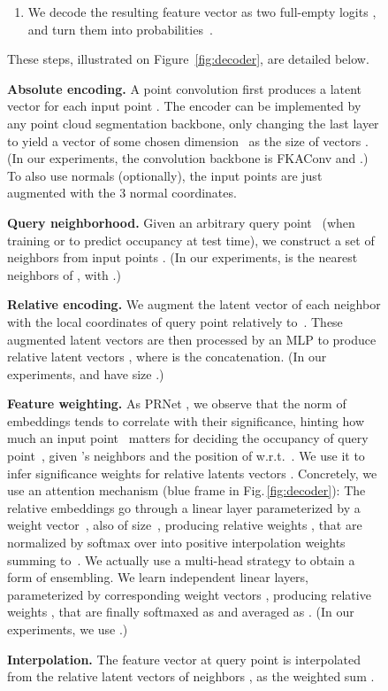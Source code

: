 \documentclass[10pt,twocolumn,letterpaper]{article}
\begin{document}
\begin{figure}[t]
\begin{enumerate}[itemsep=-2pt,topsep=-1pt]
    \item We decode the resulting feature vector  as two full-empty logits , and turn them into probabilities~.
    \label{decodelast}
    
\end{enumerate}\vspace{3pt}
These steps, illustrated on Figure~\ref{fig:decoder}, are detailed below.

\textbf{Absolute encoding.} 
A point convolution first produces a latent vector  for each input point . The encoder  can be implemented by any point cloud segmentation backbone, only changing the last layer to yield a vector of some chosen dimension~ as the size of vectors . (In our experiments, the convolution backbone is FKAConv \cite{Boulch2020ACCV} and .) To also use normals (optionally), the input points are just augmented with the 3 normal coordinates.

\textbf{Query neighborhood.} 
Given an arbitrary query point~ (when training or to predict occupancy at test time), we construct a set of neighbors  from input points . (In our experiments,  is the  nearest neighbors of , with .)

\textbf{Relative encoding.} 
We augment the latent vector  of
each neighbor  with the local coordinates  of query point  relatively to~. These augmented latent vectors are then processed by an MLP  to produce relative latent vectors , where  is the concatenation. (In our experiments,  and  have size .)


\textbf{Feature weighting.}
As PRNet \cite{Wang2019NeurIPS}, we observe that the norm of embeddings  tends to correlate with their significance, hinting how much an input point~ matters for deciding the occupancy of query point~, given 's neighbors and the position of  w.r.t.~.
We use it to infer significance weights for relative latents vectors . Concretely, we use an attention mechanism (blue frame in Fig.\,\ref{fig:decoder}): The relative embeddings  go through a linear layer parameterized by a weight vector~, also of size~, producing relative weights , that are normalized by softmax over  into positive interpolation weights  summing to~.
We actually use a multi-head strategy to obtain a form of ensembling. We learn  independent linear layers, parameterized by  corresponding weight vectors , producing  relative weights , that are finally softmaxed as  and averaged as . (In our experiments, we use .)

\textbf{Interpolation.} The feature vector 
 at query point  is interpolated from the relative latent vectors  of neighbors , as the weighted sum .


\end{figure}
\end{document}
